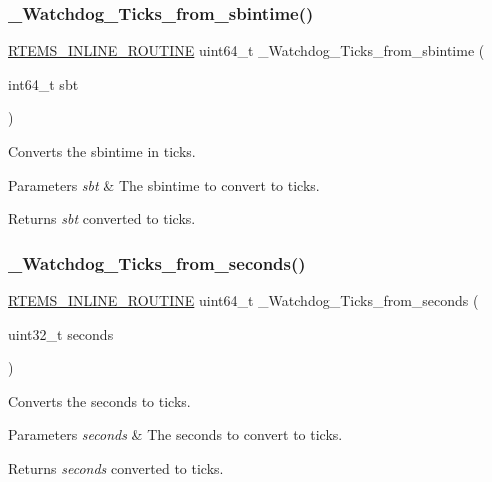 \subsubsection{\texorpdfstring{\_Watchdog\_Ticks\_from\_sbintime()}{\_Watchdog\_Ticks\_from\_sbintime()}}
{\footnotesize\ttfamily \mbox{\hyperlink{group__RTEMSScoreBaseDefs_gac216239df231d5dbd15e3520b0b9313f}{R\+T\+E\+M\+S\+\_\+\+I\+N\+L\+I\+N\+E\+\_\+\+R\+O\+U\+T\+I\+NE}} uint64\+\_\+t \+\_\+\+Watchdog\+\_\+\+Ticks\+\_\+from\+\_\+sbintime (\begin{DoxyParamCaption}\item[{int64\+\_\+t}]{sbt }\end{DoxyParamCaption})}



Converts the sbintime in ticks. 


\begin{DoxyParams}{Parameters}
{\em sbt} & The sbintime to convert to ticks.\\
\hline
\end{DoxyParams}
\begin{DoxyReturn}{Returns}
{\itshape sbt} converted to ticks. 
\end{DoxyReturn}
\mbox{\label{group__RTEMSScoreWatchdog_gae368bd39a2a612b0e7701d954d363ce6}} 
\subsubsection{\texorpdfstring{\_Watchdog\_Ticks\_from\_seconds()}{\_Watchdog\_Ticks\_from\_seconds()}}
{\footnotesize\ttfamily \mbox{\hyperlink{group__RTEMSScoreBaseDefs_gac216239df231d5dbd15e3520b0b9313f}{R\+T\+E\+M\+S\+\_\+\+I\+N\+L\+I\+N\+E\+\_\+\+R\+O\+U\+T\+I\+NE}} uint64\+\_\+t \+\_\+\+Watchdog\+\_\+\+Ticks\+\_\+from\+\_\+seconds (\begin{DoxyParamCaption}\item[{uint32\+\_\+t}]{seconds }\end{DoxyParamCaption})}



Converts the seconds to ticks. 


\begin{DoxyParams}{Parameters}
{\em seconds} & The seconds to convert to ticks.\\
\hline
\end{DoxyParams}
\begin{DoxyReturn}{Returns}
{\itshape seconds} converted to ticks. 
\end{DoxyReturn}
\mbox{\label{group__RTEMSScoreWatchdog_ga04e1294fd46a613921a5323b3dc0b090}} 

